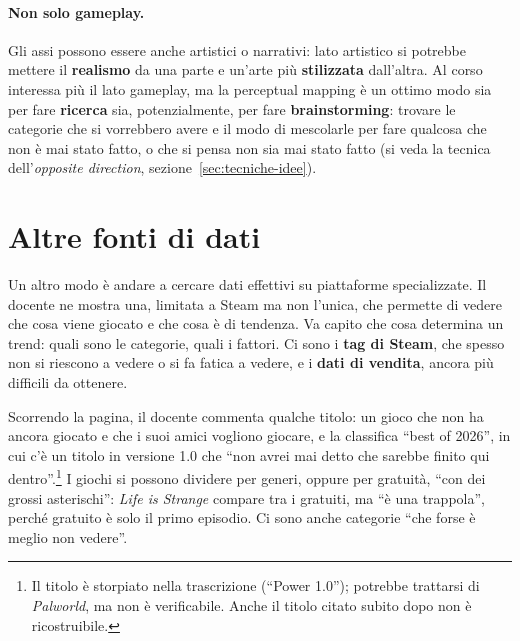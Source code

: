 \paragraph{Non solo gameplay.} Gli assi possono essere anche artistici o
narrativi: lato artistico si potrebbe mettere il \textbf{realismo} da una
parte e un'arte più \textbf{stilizzata} dall'altra. Al corso interessa più il
lato gameplay, ma la perceptual mapping è un ottimo modo sia per fare
\textbf{ricerca} sia, potenzialmente, per fare \textbf{brainstorming}: trovare
le categorie che si vorrebbero avere e il modo di mescolarle per fare
qualcosa che non è mai stato fatto, o che si pensa non sia mai stato fatto
(si veda la tecnica dell'\emph{opposite direction},
sezione~\ref{sec:tecniche-idee}).

\section{Altre fonti di dati}
\label{sec:fonti-dati}



Un altro modo è andare a cercare dati effettivi su piattaforme
specializzate. Il docente ne mostra una, limitata a Steam ma non l'unica, che
permette di vedere che cosa viene giocato e che cosa è di tendenza. Va capito
che cosa determina un trend: quali sono le categorie, quali i fattori. Ci
sono i \textbf{tag di Steam}, che spesso non si riescono a vedere o si fa
fatica a vedere, e i \textbf{dati di vendita}, ancora più difficili da
ottenere.

Scorrendo la pagina, il docente commenta qualche titolo: un gioco che non ha
ancora giocato e che i suoi amici vogliono giocare, e la classifica ``best of
2026'', in cui c'è un titolo in versione 1.0 che ``non avrei mai detto che
sarebbe finito qui dentro''.\footnote{Il titolo è storpiato nella
trascrizione (``Power 1.0''); potrebbe trattarsi di \emph{Palworld}, ma non
è verificabile. Anche il titolo citato subito dopo non è ricostruibile.} I
giochi si possono dividere per generi, oppure per gratuità, ``con dei grossi
asterischi'': \emph{Life is Strange} compare tra i gratuiti, ma ``è una
trappola'', perché gratuito è solo il primo episodio. Ci sono anche
categorie ``che forse è meglio non vedere''.

